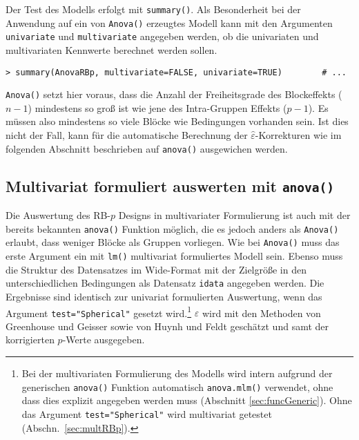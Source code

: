 Der Test des Modells erfolgt mit \lstinline!summary()!. Als Besonderheit bei der Anwendung auf ein von \lstinline!Anova()! erzeugtes Modell kann mit den Argumenten \lstinline!univariate! und \lstinline!multivariate! angegeben werden, ob die univariaten und multivariaten Kennwerte berechnet werden sollen.
\begin{lstlisting}
> summary(AnovaRBp, multivariate=FALSE, univariate=TRUE)        # ...
\end{lstlisting}

\lstinline!Anova()! setzt hier voraus, dass die Anzahl der Freiheitsgrade des Blockeffekts ($n-1$) mindestens so groß ist wie jene des Intra-Gruppen Effekts ($p-1$). Es müssen also mindestens so viele Blöcke wie Bedingungen vorhanden sein. Ist dies nicht der Fall, kann für die automatische Berechnung der $\hat{\varepsilon}$-Korrekturen wie im folgenden Abschnitt beschrieben auf \lstinline!anova()! ausgewichen werden.

\subsection{Multivariat formuliert auswerten mit \texttt{anova()}}
\label{sec:RBpMX}

Die Auswertung des RB-$p$ Designs in multivariater Formulierung ist auch mit der bereits bekannten \lstinline!anova()! Funktion möglich, die es jedoch anders als \lstinline!Anova()! erlaubt, dass weniger Blöcke als Gruppen vorliegen. Wie bei \lstinline!Anova()! muss das erste Argument ein mit \lstinline!lm()! multivariat formuliertes Modell sein. Ebenso muss die Struktur des Datensatzes im Wide-Format mit der Zielgröße in den unterschiedlichen Bedingungen als Datensatz \lstinline!idata! angegeben werden. Die Ergebnisse sind identisch zur univariat formulierten Auswertung, wenn das Argument \lstinline!test="Spherical"! gesetzt wird.\footnote{\label{ftn:spherical}Bei der multivariaten Formulierung des Modells wird intern aufgrund der generischen \lstinline!anova()! Funktion automatisch \lstinline!anova.mlm()! verwendet, ohne dass dies explizit angegeben werden muss (Abschnitt \ref{sec:funcGeneric}). Ohne das Argument \lstinline!test="Spherical"! wird multivariat getestet (Abschn.\ \ref{sec:multRBp}).} $\varepsilon$ wird mit den Methoden von Greenhouse und Geisser sowie von Huynh und Feldt geschätzt und samt der korrigierten $p$-Werte ausgegeben.

